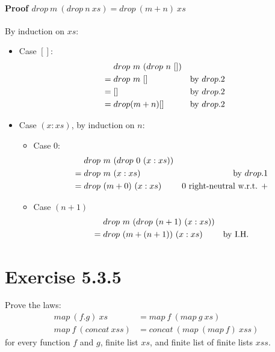 \documentclass{article}[10pt]
\begin{document}
    \paragraph{Proof $drop\ m\ (drop\ n\ xs) = drop\ (m+n)\ xs$}
    By induction on $xs$:
    \begin{itemize}
      \item Case $[]$:
      \begin{align*}
        &\mathrel{\hphantom{=}} drop\ m\ (drop\ n\ [])\\
        &= drop\ m\ []                         &\text{by }drop.2\\
        &= []                                  &\text{by }drop.2\\
        &= drop (m+n) []                       &\text{by }drop.2
      \end{align*}
      \item Case $(x:xs)$, by induction on $n$:
      \begin{itemize}
        \item Case $0$:
          \begin{align*}
            &\mathrel{\hphantom{=}} drop\ m\ (drop\ 0\ (x:xs))\\
            &=drop\ m\ (x:xs)            &\text{by }drop.1\\
            &=drop\ (m+0)\ (x:xs)        &0 \text{ right-neutral w.r.t. }+
          \end{align*}
        \item Case $(n+1)$
          \begin{align*}
            &\mathrel{\hphantom{=}} drop\ m\ (drop\ (n+1)\ (x:xs))\\
            &=drop\ (m+(n+1))\ (x:xs) &\text{by I.H.}\\
          \end{align*}
      \end{itemize}
    \end{itemize}
  \section{Exercise 5.3.5}
    Prove the laws:
    \begin{align*}
      map\ (f . g)\ xs      &= map\ f\ (map\ g\ xs)\\
      map\ f\ (concat\ xss) &= concat\ (map\ (map\ f)\ xss)
    \end{align*}
    for every function $f$ and $g$, finite list $xs$, and finite list of finite lists $xss$.
\end{document}
